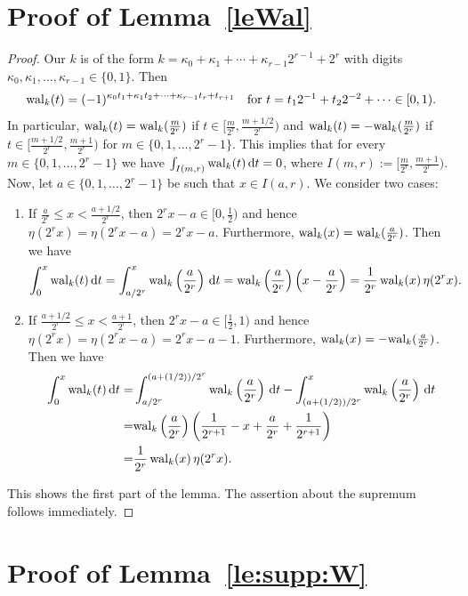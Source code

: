 \documentclass[namedate,webpdf,imanum]{ima-authoring-arxiv}%
\theoremstyle{thmstyletwo}%
\numberwithin{equation}{section}
\newcommand{\rd}{\, {\rm d}}
\newcommand{\wal}{{\rm wal}}
\begin{document}
\begin{appendix}
\section{Proof of Lemma~\ref{leWal}}\label{app:A}    

\begin{proof}
Our $k$ is of the form $k=\kappa_0+\kappa_1+\cdots+\kappa_{r-1} 2^{r-1}+2^r$ with digits $\kappa_0,\kappa_1,\ldots,\kappa_{r-1}\in \{0,1\}$. Then $$\wal_k(t)=(-1)^{\kappa_0 t_1+\kappa_1 t_2+\cdots +\kappa_{r-1} t_r+t_{r+1}} \quad \mbox{for $t=t_1 2^{-1}+t_2 2^{-2}+\cdots \in [0,1)$.}$$ In particular, $\wal_k(t)=\wal_k(\frac{m}{2^r})$ if $t \in [\frac{m}{2^r},\frac{m+1/2}{2^r})$ and $\wal_k(t)=-\wal_k(\frac{m}{2^r})$ if $t \in [\frac{m+1/2}{2^r},\frac{m+1}{2^r})$ for $m \in \{0,1,\ldots,2^r-1\}$. This implies that for every $m \in \{0,1,\ldots,2^r-1\}$ we have $\int_{I(m,r)} \wal_k(t) \rd t=0$, where $I(m,r):=[\frac{m}{2^r},\frac{m+1}{2^r})$. Now, let $a \in \{0,1,\ldots,2^r-1\}$ be such that $x \in I(a,r)$. We consider two cases:
\begin{enumerate}
\item If $\frac{a}{2^r} \le x < \frac{a+1/2}{2^r}$, then $2^r x-a \in [0,\tfrac{1}{2})$ and hence $\eta(2^rx)=\eta(2^r x-a )=2^r x-a$. Furthermore, $\wal_k(x)=\wal_k(\frac{a}{2^r})$. Then we have $$\int_0^x \wal_k(t)\rd t = \int_{a/2^r}^x \wal_k\left(\frac{a}{2^r}\right) \rd t = \wal_k\left(\frac{a}{2^r}\right) \left(x-\frac{a}{2^r}\right)=\frac{1}{2^r} \, \wal_k(x) \, \eta(2^r x).$$
\item If $\frac{a+1/2}{2^r} \le x < \frac{a+1}{2^r}$, then $2^r x - a \in [\frac{1}{2},1)$ and hence $\eta(2^rx)=\eta(2^r x-a)=2^r x-a-1$. Furthermore, $\wal_k(x)=-\wal_k(\frac{a}{2^r})$. Then we have  
\begin{align*}
\int_0^x \wal_k(t)\rd t = & \int_{a/2^r}^{(a+(1/2))/2^r} \wal_k\left(\frac{a}{2^r}\right) \rd t - \int_{(a+(1/2))/2^r}^x  \wal_k\left(\frac{a}{2^r}\right) \rd t  \\
= & \wal_k\left(\frac{a}{2^r}\right) \left( \frac{1}{2^{r+1}}-x+\frac{a}{2^r}+\frac{1}{2^{r+1}}\right)\\
= & \frac{1}{2^r} \, \wal_k(x) \, \eta(2^r x).
\end{align*}
\end{enumerate}
This shows the first part of the lemma. The assertion about the supremum follows immediately.
\end{proof}


\section{Proof of Lemma~\ref{le:supp:W}}\label{app:B}   


\end{appendix}
\end{document}
